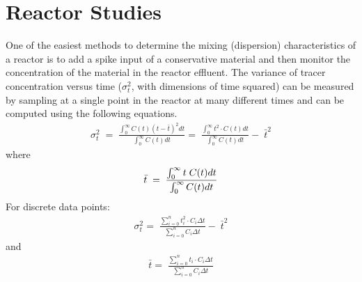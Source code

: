 \documentclass[letterpaper,10pt,english]{sphinxmanual}
\begin{document}
\section{Reactor Studies}
\label{\detokenize{Reactor_Characteristics/Reactor_Characteristics:reactor-studies}}\label{\detokenize{Reactor_Characteristics/Reactor_Characteristics:heading-reactor-studies}}
One of the easiest methods to determine the mixing (dispersion) characteristics of a reactor is to add a spike input of a conservative material and then monitor the concentration of the material in the reactor effluent. The variance of tracer concentration versus time (\(\sigma _{t}^{2}\), with dimensions of time squared) can be measured by sampling at a single point in the reactor at many different times and can be computed using the following equations.
\begin{equation}\label{equation:Reactor_Characteristics/Reactor_Characteristics:Reactor_Characteristics/Reactor_Characteristics:11}
\begin{split}\sigma _{t}^{2} \; =\; \frac{\int _{0}^{\infty }C(t)(t-\bar{t})^{2}  dt}{\int _{0}^{\infty }C(t) dt} =\; \frac{\int _{0}^{\infty }t^{2} \cdot C(t) dt}{\int _{0}^{\infty }C(t) dt} -\; \bar{t}^{2}\end{split}
\end{equation}
where
\begin{equation}\label{equation:Reactor_Characteristics/Reactor_Characteristics:Reactor_Characteristics/Reactor_Characteristics:12}
\begin{split}\bar{t}{\rm \; }={\rm \; }\frac{\int _{0}^{\infty }t\; C(t)dt }{\int _{0}^{\infty }C(t)dt }\end{split}
\end{equation}
For discrete data points:
\begin{equation}\label{equation:Reactor_Characteristics/Reactor_Characteristics:eq_Reactor_sigma}
\begin{split}\sigma _{t}^{2} =\; \frac{\sum _{i=0}^{n}t_{i}^{2} \cdot C_{i}  \Delta t}{\sum _{i=0}^{n}C_{i}  \Delta t} -\; \bar{t}^{2}\end{split}
\end{equation}
and
\begin{equation}\label{equation:Reactor_Characteristics/Reactor_Characteristics:eq_Reactor_tbar}
\begin{split}\bar{t}=\; \frac{\sum _{i=0}^{n}t_{i} \cdot C_{i}  \Delta t}{\sum _{i=0}^{n}C_{i}  \Delta t}\end{split}
\end{equation}
\end{document}
